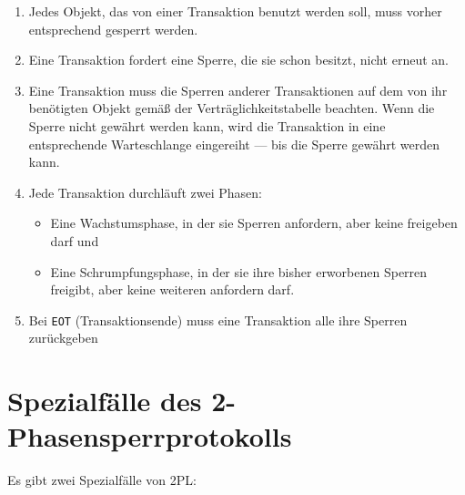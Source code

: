\documentclass{lehramt-informatik-haupt}
\begin{document}
\begin{enumerate}
\item Jedes Objekt, das von einer Transaktion benutzt werden soll, muss
vorher entsprechend gesperrt werden.

\item Eine Transaktion fordert eine Sperre, die sie schon besitzt, nicht
erneut an.

\item Eine Transaktion muss die Sperren anderer Transaktionen auf dem
von ihr benötigten Objekt gemäß der Verträglichkeitstabelle beachten.
Wenn die Sperre nicht gewährt werden kann, wird die Transaktion in eine
entsprechende Warteschlange eingereiht — bis die Sperre gewährt werden
kann.

\item Jede Transaktion durchläuft zwei Phasen:

\begin{itemize}
\item Eine Wachstumsphase, in der sie Sperren anfordern, aber keine
freigeben darf und

\item Eine Schrumpfungsphase, in der sie ihre bisher erworbenen
Sperren freigibt, aber keine weiteren anfordern darf.
\end{itemize}

\item Bei \texttt{EOT} (Transaktionsende) muss eine Transaktion alle
ihre Sperren zurückgeben
\end{enumerate}

\section{Spezialfälle des 2-Phasensperrprotokolls}

Es gibt zwei Spezialfälle von 2PL:
\end{document}
